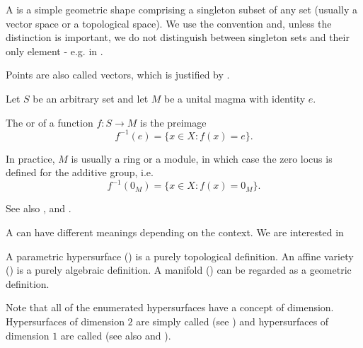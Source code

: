 \begin{definition}\label{def:point}
  A  is a simple geometric shape comprising a singleton subset of any set (usually a vector space or a topological space). We use the convention  and, unless the distinction is important, we do not distinguish between singleton sets and their only element - e.g. in .

  Points are also called vectors, which is justified by .
\end{definition}

\begin{definition}\label{def:zero_locus}
  Let \( S \) be an arbitrary set and let \( M \) be a unital magma with identity \( e \).

  The  or  of a function \( f: S \to M \) is the preimage
  \begin{equation*}
    f^{-1}(e) = \{ x \in X \colon f(x) = e \}.
  \end{equation*}

  In practice, \( M \) is usually a ring or a module, in which case the zero locus is defined for the additive group, i.e.
  \begin{equation*}
    f^{-1}(0_M) = \{ x \in X \colon f(x) = 0_M \}.
  \end{equation*}

  See also ,  and .
\end{definition}

\begin{definition}\label{def:hypersurface}
  A  can have different meanings depending on the context. We are interested in

  \begin{defenum}
     A parametric hypersurface () is a purely topological definition.
     An affine variety () is a purely algebraic definition.
     A manifold () can be regarded as a geometric definition.
  \end{defenum}

  Note that all of the enumerated hypersurfaces have a concept of dimension. Hypersurfaces of dimension \( 2 \) are simply called  (see ) and hypersurfaces of dimension \( 1 \) are called  (see also  and ).
\end{definition}

